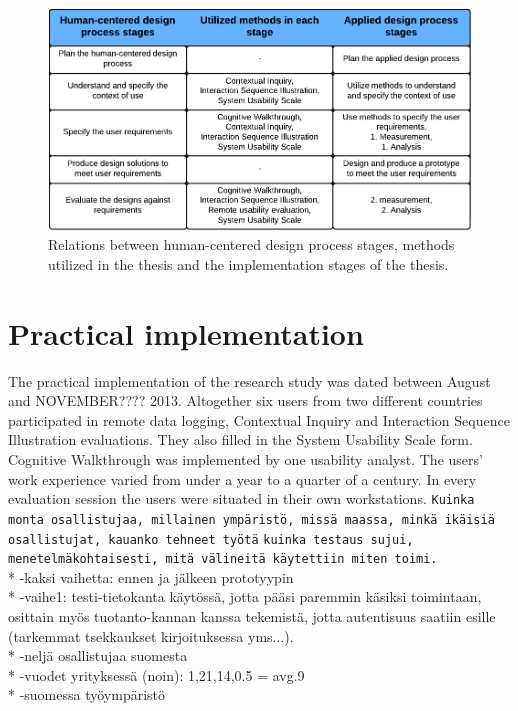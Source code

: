 \documentclass[12pt,a4paper,oneside,pdftex]{report}
\begin{document}
\begin{figure}[H]
  	\centering
    	\includegraphics[width=1.0\textwidth]{./images/applied_hcd_process.png}
  	\caption{Relations between human-centered design process stages, methods utilized in the thesis and the implementation stages of the thesis.}
	\label{fig:hcd_process}
\end{figure}

\section{Practical implementation}
 \label{sec:implementation}
    
 The practical implementation of the research study was dated between August and NOVEMBER???? 2013. Altogether six users from two different countries participated in remote data logging, Contextual Inquiry and Interaction Sequence Illustration evaluations. They also filled in the System Usability Scale form. Cognitive Walkthrough was implemented by one usability analyst. The users' work experience varied from under a year to a quarter of a century. In every evaluation session the users were situated in their own workstations. 
	\texttt{Kuinka monta osallistujaa, millainen ympäristö, missä maassa, minkä ikäisiä osallistujat, kauanko tehneet työtä}
    	\texttt{kuinka testaus sujui, menetelmäkohtaisesti, mitä välineitä käytettiin miten toimi.}
    	\\*
    	-kaksi vaihetta: ennen ja jälkeen prototyypin
    	\\*
    	-vaihe1: testi-tietokanta käytössä, jotta pääsi paremmin käsiksi toimintaan, osittain myös tuotanto-kannan kanssa tekemistä, jotta autentisuus saatiin esille (tarkemmat tsekkaukset kirjoituksessa yms...).
    	\\*
    	 -neljä osallistujaa suomesta
    	 \\*
    	 -vuodet yrityksessä (noin): 1,21,14,0.5 = avg.9
    	 \\*
    	 -suomessa työympäristö
\end{document}
